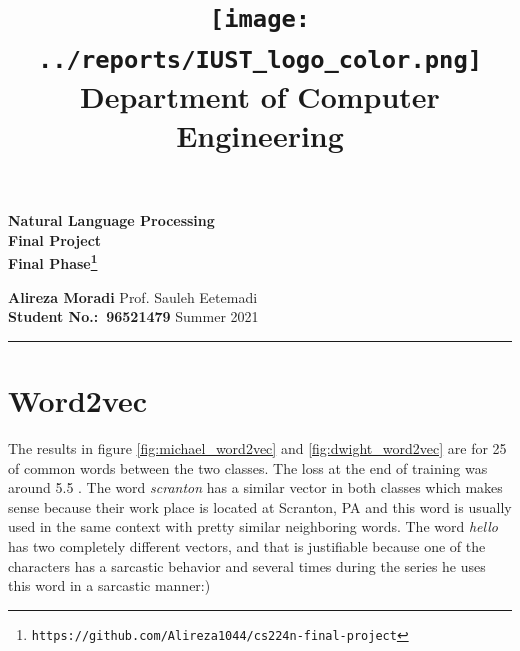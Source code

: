 \documentclass[11pt]{article}
\title{
    \texttt{[image: ../reports/IUST\_logo\_color.png]} \\
    \textbf{Department of Computer Engineering}\\
}
\def \Subject {Natural Language Processing}
\def \Course {Final Project\\\small Final Phase}
\def \Author {Alireza Moradi}
\def \Report {Summer 2021}
\def \Prof {Sauleh Eetemadi}
\def \StudentNumber {96521479}
\begin{document}
\date{\vspace{-15pt}}
\maketitle

\thispagestyle{empty}
\begin{center}
\vspace{.4cm}
{\bf {\huge \Subject}}\\
\vspace{2pt}
{\bf \Large \Course\footnote{\texttt{https://github.com/Alireza1044/cs224n-final-project}}}
\vspace{.2cm}
\end{center}
{\bf \Author } 
\hspace{\fill} 
{Prof. \Prof} \\
{\bf Student No.:\ \StudentNumber}
\hspace{\fill} 
{\small \Report} \\
\hrule
\vspace{0.8cm}

\clearpage
\setcounter{page}{1}

\tableofcontents
\newpage
\listoffigures
{}
\listoftables
{}

\clearpage
{}



\section{Word2vec}
The results in figure \ref{fig:michael_word2vec} and \ref{fig:dwight_word2vec} are for 25 of common words between the two classes. The loss at the end of training was around 5.5 . The word \textit{scranton} has a similar vector in both classes which makes sense because their work place is located at Scranton, PA and this word is usually used in the same context with pretty similar neighboring words. The word \textit{hello} has two completely different vectors, and that is justifiable because one of the characters has a sarcastic behavior and several times during the series he uses this word in a sarcastic manner:)
\end{document}
